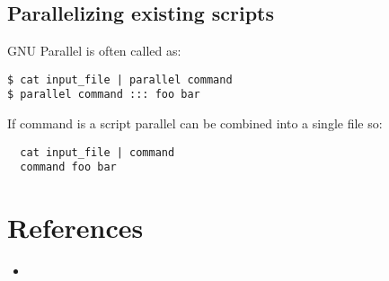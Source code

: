 \documentclass{article}
\begin{document}
\subsection{Parallelizing existing scripts}
GNU Parallel is often called as:
\begin{lstlisting}
$ cat input_file | parallel command
$ parallel command ::: foo bar
\end{lstlisting}
If command is a script parallel can be combined into a single file so:
\begin{lstlisting}
  cat input_file | command
  command foo bar
\end{lstlisting}
\section{References}

\begin{itemize}
\item{}
\end{itemize}
\end{document}
